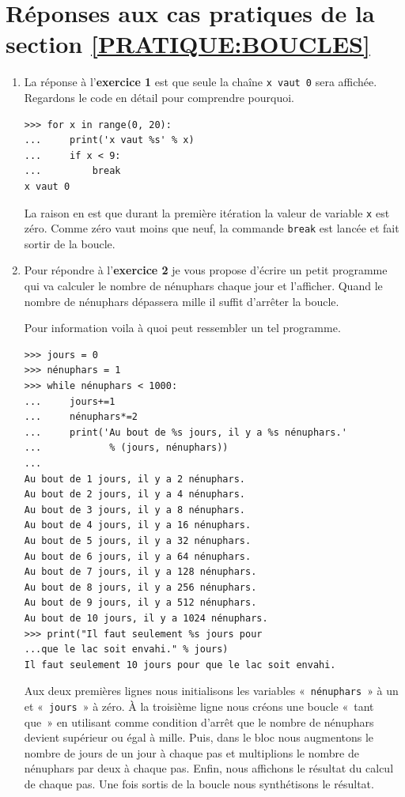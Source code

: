 \section{Réponses aux cas pratiques de la section  \ref{PRATIQUE:BOUCLES}\label{REPONSES:BOUCLES}}
\begin{enumerate}
\item La réponse à l'\textbf{exercice 1} est que seule la chaîne \texttt{x vaut 0} sera affichée. Regardons le code en détail pour comprendre pourquoi.
\begin{Verbatim}[frame=single,rulecolor=\color{gray}, label=ne pas taper]
>>> for x in range(0, 20):
... 	print('x vaut %s' % x)
... 	if x < 9:
... 		break
x vaut 0
\end{Verbatim}

La raison en est que durant la première itération la valeur de variable \texttt{x} est zéro. Comme zéro vaut moins que neuf, la commande \texttt{break} est lancée et fait sortir de la boucle.

\item Pour répondre à l'\textbf{exercice 2} je vous propose d'écrire un petit programme qui va calculer le nombre de nénuphars chaque jour et l'afficher. Quand le nombre de nénuphars dépassera mille il suffit d'arrêter la boucle.

Pour information voila à quoi peut ressembler un tel programme.
\begin{Verbatim}[frame=single,rulecolor=\color{gray}, label=ne pas taper]
>>> jours = 0
>>> nénuphars = 1
>>> while nénuphars < 1000:
...     jours+=1
...     nénuphars*=2 
...     print('Au bout de %s jours, il y a %s nénuphars.' 
...            % (jours, nénuphars))
... 
Au bout de 1 jours, il y a 2 nénuphars.
Au bout de 2 jours, il y a 4 nénuphars.
Au bout de 3 jours, il y a 8 nénuphars.
Au bout de 4 jours, il y a 16 nénuphars.
Au bout de 5 jours, il y a 32 nénuphars.
Au bout de 6 jours, il y a 64 nénuphars.
Au bout de 7 jours, il y a 128 nénuphars.
Au bout de 8 jours, il y a 256 nénuphars.
Au bout de 9 jours, il y a 512 nénuphars.
Au bout de 10 jours, il y a 1024 nénuphars.
>>> print("Il faut seulement %s jours pour 
...que le lac soit envahi." % jours)
Il faut seulement 10 jours pour que le lac soit envahi.
\end{Verbatim}

Aux deux premières lignes nous initialisons les variables « \verb+nénuphars+ » à un et « \verb+jours+ » à zéro.  
À la troisième ligne nous créons une boucle « tant que » en utilisant comme condition d'arrêt que le nombre de nénuphars devient supérieur ou égal à mille. Puis, dans le bloc nous augmentons le nombre de jours de un jour à chaque pas et multiplions le nombre de nénuphars par deux à chaque pas. Enfin, nous affichons le résultat du calcul de chaque pas. Une fois sortis de la boucle nous synthétisons le résultat. 
\end{enumerate}

